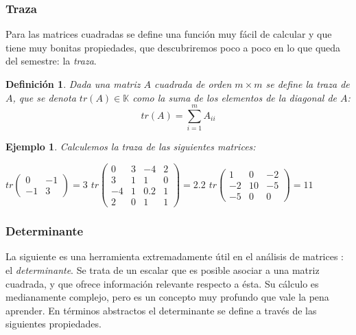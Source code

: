 \documentclass[12pt]{book}
\newtheorem{defi}{Definici\'on}
\newtheorem{ejem}{Ejemplo}
\def\K{\mathbb{K}}
\begin{document}
\subsubsection{Traza}

Para las matrices cuadradas se define una función muy fácil de calcular y que tiene muy bonitas propiedades, que descubriremos poco a poco en lo que queda del semestre: la \emph{traza}.
\begin{defi}
  Dada una matriz $A$ cuadrada de orden $m\times m$ se define la traza de $A$, que se denota $tr(A)\in\K$ como la suma de los elementos de la diagonal de $A$:
  $$tr(A)=\sum_{i=1}^m A_{ii}$$
\end{defi}
\begin{ejem}
Calculemos la traza de las siguientes matrices:
\begin{center}
$tr\left(\begin{array}{rr}0& -1\\ -1& 3\end{array}\right)=3$\qquad
$tr\left(\begin{array}{rrrr}0& 3&-4&2\\ 3& 1& 1&0\\ -4&1&0.2&1\\2&0&1&1\end{array}\right)=2.2$\qquad
$tr\left(\begin{array}{rrr}1& 0&-2\\ -2& 10&-5\\-5&0&0\end{array}\right)=11$
\end{center}
\end{ejem}

\subsubsection{Determinante}

La siguiente es una herramienta extremadamente útil en el análisis de matrices : el \emph{determinante}.
Se trata de un escalar que es posible asociar a una matriz cuadrada, y que ofrece información relevante respecto a ésta.
Su cálculo es medianamente complejo, pero es un concepto muy profundo que vale la pena aprender.
En términos abstractos el determinante se define a través de las siguientes propiedades.
 
\end{document}
